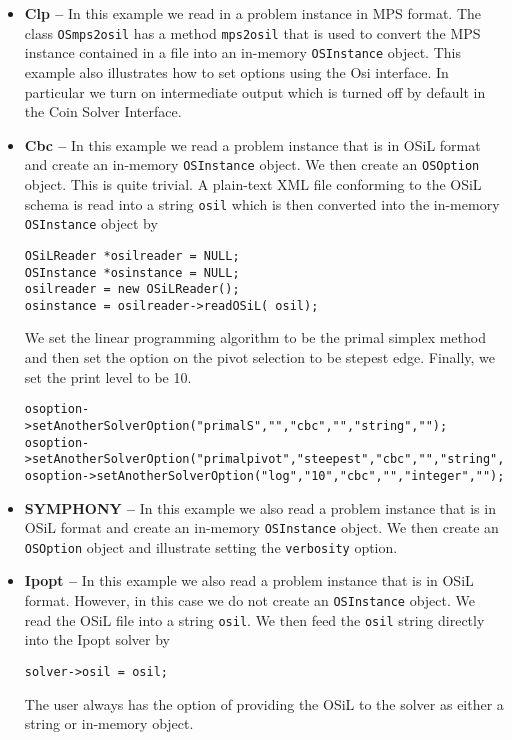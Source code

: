 \documentclass[11pt]{article}
\renewcommand{\{}{{\char"7B}}
\renewcommand{\}}{{\char"7D}}
\renewcommand{\^}{{\char"0D}}
\renewcommand{\'}{{\char"0D}}
\begin{document}
\begin{itemize}
\item {\bf Clp --}  In this example we read in a problem instance in MPS format.  The class 
{\tt OSmps2osil}  has a method {\tt mps2osil} that is used to convert the MPS instance contained 
in a file into an in-memory {\tt OSInstance} object. This example also illustrates how to 
set options using the Osi interface. In particular we turn on intermediate output which is 
turned off by default in the Coin Solver Interface. 

\item {\bf Cbc --}  In this example we read a problem instance that is in OSiL format and create 
an in-memory {\tt OSInstance} object.  We then create an {\tt OSOption} object.  This is quite trivial.  
A  plain-text XML file conforming to the OSiL schema is read into a string {\tt osil} which is then 
converted into the in-memory {\tt OSInstance} object by

\begin{verbatim}
OSiLReader *osilreader = NULL;
OSInstance *osinstance = NULL;
osilreader = new OSiLReader(); 
osinstance = osilreader->readOSiL( osil);
\end{verbatim}


 We set the linear programming algorithm to be the primal simplex method and then set the option 
on the pivot selection to be stepest edge.  Finally, we set the print level to be 10.

\begin{verbatim}
osoption->setAnotherSolverOption("primalS","","cbc","","string","");
osoption->setAnotherSolverOption("primalpivot","steepest","cbc","","string","");
osoption->setAnotherSolverOption("log","10","cbc","","integer","");
\end{verbatim}


\item {\bf SYMPHONY --}   In this example we also read a problem instance that is in OSiL format and 
create an in-memory {\tt OSInstance} object.  We then create an {\tt OSOption} object and 
illustrate setting the {\tt verbosity} option.

\item {\bf Ipopt --}   In this example we also read a problem instance that is in OSiL format.  
However, in this case we do  not create an {\tt OSInstance} object. We read the OSiL file into 
a string {\tt osil}.  We then feed the {\tt osil} string directly into the Ipopt solver by
\begin{verbatim}
solver->osil = osil;
\end{verbatim} 
The user always has the option of providing the OSiL to the solver as either a string or in-memory object.


\end{itemize}
\end{document}
